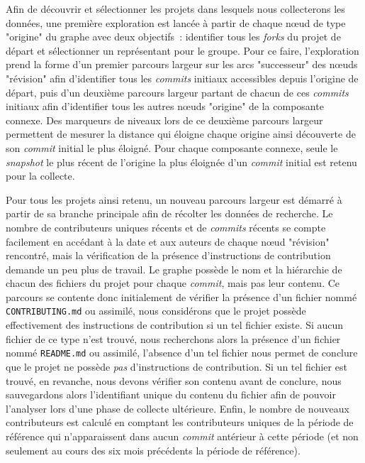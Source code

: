 \documentclass[dvipsnames]{llncs}
\newcommand{\en}[1]{\foreignlanguage{english}{\emph{#1}}}
\begin{document}
    Afin de découvrir et sélectionner les projets dans lesquels nous collecterons les données, une première
    exploration est lancée à partir de chaque nœud de type "origine" du graphe avec deux objectifs :
    identifier tous les \en{forks} du projet de départ et sélectionner un représentant pour le groupe. Pour ce
    faire, l'exploration prend la forme d'un premier parcours largeur sur les arcs "successeur" des nœuds
    "révision" afin d'identifier tous les \en{commits} initiaux accessibles depuis l'origine de départ, puis
    d'un deuxième parcours largeur partant de chacun de ces \en{commits} initiaux afin d'identifier tous les
    autres nœuds "origine" de la composante connexe. Des marqueurs de niveaux lors de ce deuxième parcours
    largeur permettent de mesurer la distance qui éloigne chaque origine ainsi découverte de son \en{commit}
    initial le plus éloigné. Pour chaque composante connexe, seule le \en{snapshot} le plus récent de
    l'origine la plus éloignée d'un \en{commit} initial est retenu pour la collecte.

    Pour tous les projets ainsi retenu, un nouveau parcours largeur est démarré à partir de sa branche
    principale afin de récolter les données de recherche. Le nombre de contributeurs uniques récents et de
    \en{commits} récents se compte facilement en accédant à la date et aux auteurs de chaque nœud "révision"
    rencontré, mais la vérification de la présence d'instructions de contribution demande un peu plus de
    travail. Le graphe possède le nom et la hiérarchie de chacun des fichiers du projet pour chaque
    \en{commit}, mais pas leur contenu. Ce parcours se contente donc initialement de vérifier la présence d'un
    fichier nommé \texttt{CONTRIBUTING.md} ou assimilé, nous considérons que le projet possède effectivement
    des instructions de contribution si un tel fichier existe. Si aucun fichier de ce type n'est trouvé, nous
    recherchons alors la présence d'un fichier nommé \texttt{README.md} ou assimilé, l'absence d'un tel
    fichier nous permet de conclure que le projet ne possède \emph{pas} d'instructions de contribution. Si un
    tel fichier est trouvé, en revanche, nous devons vérifier son contenu avant de conclure, nous sauvegardons
    alors l'identifiant unique du contenu du fichier afin de pouvoir l'analyser lors d'une phase de collecte
    ultérieure. Enfin, le nombre de nouveaux contributeurs est calculé en comptant les contributeurs uniques
    de la période de référence qui n'apparaissent dans aucun \en{commit} antérieur à cette période (et non
    seulement au cours des six mois précédents la période de référence).
\end{document}
